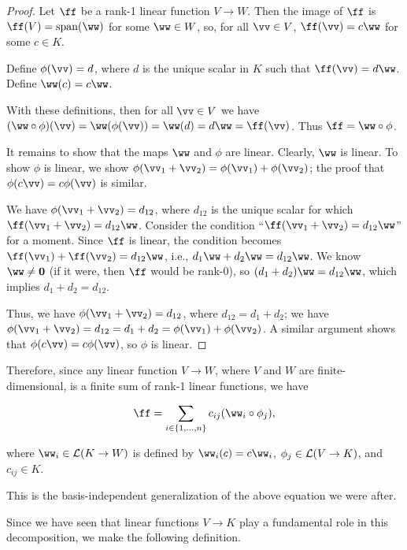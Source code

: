 \begin{proof}
    Let $\ff$ be a rank-1 linear function $V \rightarrow W$. Then the image of $\ff$ is $\ff(V) = \spann(\ww)$ for some $\ww \in W$, so, for all $\vv \in V$, $\ff(\vv) = c\ww$ for some $c \in K$.
    
    Define $\phi(\vv) = d$, where $d$ is the unique scalar in $K$ such that $\ff(\vv) = d \ww$. Define $\ww(c) = c \ww$. 
    
    With these definitions, then for all $\vv \in V$ we have $(\ww \circ \phi)(\vv) = \ww(\phi(\vv)) = \ww(d) = d\ww = \ff(\vv)$. Thus $\ff = \ww \circ \phi$.
    
    It remains to show that the maps $\ww$ and $\phi$ are linear. Clearly, $\ww$ is linear. To show $\phi$ is linear, we show $\phi(\vv_1 + \vv_2) = \phi(\vv_1) + \phi(\vv_2)$; the proof that $\phi(c\vv) = c\phi(\vv)$ is similar.
    
    We have $\phi(\vv_1 + \vv_2) = d_{12}$, where $d_{12}$ is the unique scalar for which $\ff(\vv_1 + \vv_2) = d_{12} \ww$. Consider the condition ``$\ff(\vv_1 + \vv_2) = d_{12} \ww$'' for a moment. Since $\ff$ is linear, the condition becomes $\ff(\vv_1) + \ff(\vv_2) = d_{12} \ww$, i.e., $d_1 \ww + d_2 \ww = d_{12} \ww$. We know $\ww \neq \mathbf{0}$ (if it were, then $\ff$ would be rank-0), so $(d_1 + d_2) \ww = d_{12} \ww$, which implies $d_1 + d_2 = d_{12}$.
    
    Thus, we have $\phi(\vv_1 + \vv_2) = d_{12}$, where $d_{12} = d_1 + d_2$; we have $\phi(\vv_1 + \vv_2) = d_{12} = d_1 + d_2 = \phi(\vv_1) + \phi(\vv_2)$. A similar argument shows that $\phi(c\vv) = c\phi(\vv)$, so $\phi$ is linear.
\end{proof}

Therefore, since any linear function $V \rightarrow W$, where $V$ and $W$ are finite-dimensional, is a finite sum of rank-1 linear functions, we have

\begin{align*}
    \ff = \sum_{\substack{i \in \{1, ..., n\}}} c_{ij} (\ww_i \circ \phi_j),
\end{align*}

where $\ww_i \in \LLLL(K \rightarrow W)$ is defined by $\ww_i(c) = c \ww_i$, $\phi_j \in \mathcal{L}(V \rightarrow K)$, and $c_{ij} \in K$.

This is the basis-independent generalization of the above equation we were after.

Since we have seen that linear functions $V \rightarrow K$ play a fundamental role in this decomposition, we make the following definition.

